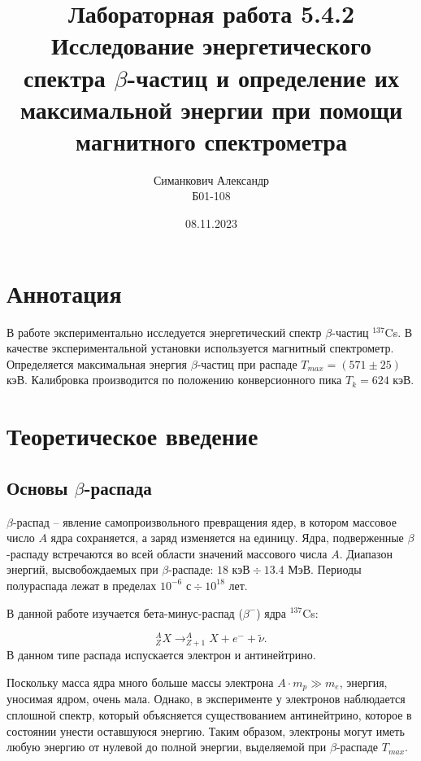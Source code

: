 \documentclass[12pt,a4paper]{article}
\title{Лабораторная работа 5.4.2 \\ Исследование энергетического спектра $\beta$-частиц и определение их максимальной энергии при помощи магнитного спектрометра}
\author{Симанкович Александр\\ Б01-108}
\date{08.11.2023}
\begin{document}
	\maketitle
	
	\section*{Аннотация}
	
	В работе экспериментально исследуется энергетический спектр $\beta$-частиц $^{137}$Cs. В качестве экспериментальной установки используется магнитный спектрометр. Определяется максимальная энергия $\beta$-частиц при распаде  $T_{max} = (571 \pm 25)$ кэВ. Калибровка производится по положению конверсионного пика $T_k = 624$ кэВ.
	
	
	\section*{Теоретическое введение}
	
	\subsection*{Основы $\beta$-распада}
	
	$\beta$-распад -- явление самопроизвольного превращения ядер, в котором массовое число $A$ ядра сохраняется, а заряд изменяется на единицу. Ядра, подверженные $\beta$-распаду встречаются во всей области значений массового числа $A$. Диапазон энергий, высвобождаемых при $\beta$-распаде: $18 \text{ кэВ} \div 13.4 \text{ МэВ}$. Периоды полураспада лежат в пределах $10^{-6} \text{ с} \div 10^{18} \text{ лет}$.
	
	В данной работе изучается бета-минус-распад ($\beta^{-}$) ядра $^{137}$Cs:
	
	\begin{equation}
		^A_Z X \rightarrow ^{A}_{Z+1} X + e^{-} + \tilde{\nu}.
	\end{equation}
	В данном типе распада испускается электрон и антинейтрино.
	
	Поскольку масса ядра много больше массы электрона $A \cdot m_{p} \gg m_{e}$, энергия, уносимая ядром, очень мала. Однако, в эксперименте у электронов наблюдается сплошной спектр, который объясняется существованием антинейтрино, которое в состоянии унести оставшуюся энергию. Таким образом, электроны могут иметь любую энергию от нулевой до полной энергии, выделяемой при $\beta$-распаде $T_{max}$.
	
\end{document}
